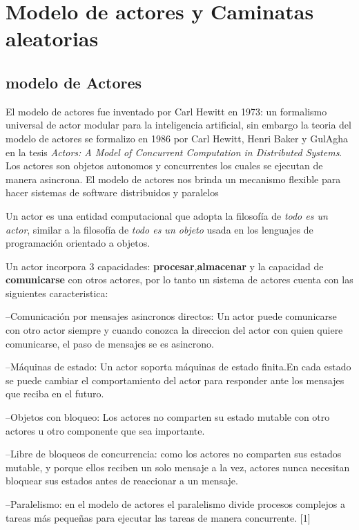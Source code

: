 \chapter{Modelo de actores y Caminatas aleatorias}

\section{modelo de Actores}


El modelo de actores fue inventado por Carl Hewitt  en 1973: un formalismo
universal de actor modular para la inteligencia artificial, sin embargo la
teoria del modelo de actores se formalizo en 1986 por Carl Hewitt, Henri Baker y
GulAgha en la  tesis \emph{Actors: A Model of Concurrent Computation in
  Distributed Systems}. Los actores son objetos autonomos y concurrentes los
cuales se ejecutan de manera asincrona. El modelo de actores  nos brinda un
mecanismo flexible para  hacer sistemas de software  distribuidos y paralelos

Un actor es una entidad computacional que adopta la filosof\'ia de \emph{todo es un actor}, similar a la filosof\'ia de \emph{todo es un objeto} usada en los lenguajes de programaci\'on orientado a objetos.


Un actor  incorpora 3 capacidades: \textbf{procesar},\textbf{almacenar} y   la capacidad de \textbf{comunicarse} con otros actores, por lo tanto un sistema de actores cuenta con las siguientes caracteristica:

--Comunicaci\'on por mensajes asincronos directos: Un actor puede comunicarse con otro actor siempre y cuando conozca la direccion del actor con quien quiere comunicarse, el paso de mensajes se es asincrono.


--M\'aquinas de estado: Un actor soporta m\'aquinas de estado finita.En cada estado  se puede cambiar el comportamiento del actor para responder ante los mensajes que reciba en el futuro.

--Objetos con bloqueo: Los actores no comparten su estado mutable con otro actores u otro componente que sea importante.

--Libre de bloqueos de concurrencia: como los actores no comparten sus estados mutable, y porque ellos reciben un solo mensaje a la vez, actores nunca necesitan bloquear sus estados antes de reaccionar a un mensaje.

--Paralelismo: en el modelo de actores el paralelismo divide procesos complejos a tareas m\'as peque\~nas para ejecutar las tareas de manera concurrente. [1]



